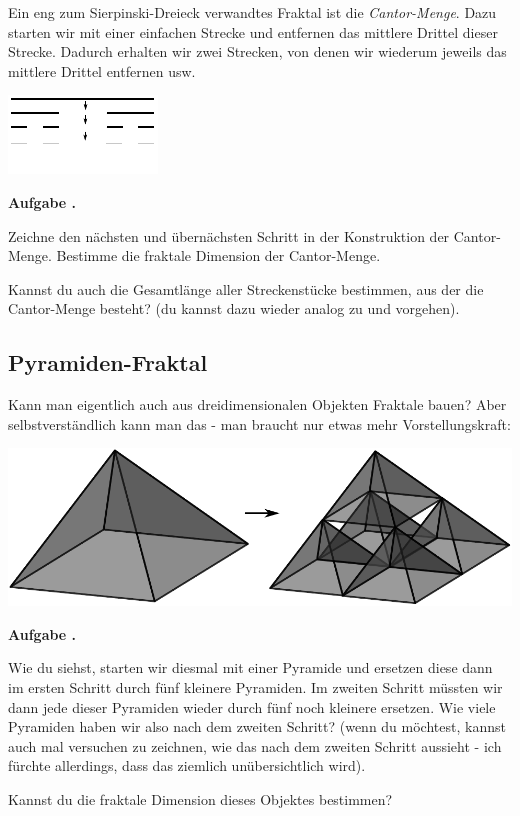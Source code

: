 \documentclass[a4paper,ngerman,12pt]{scrartcl}
\theoremstyle{definition}
\theoremstyle{plain}
\theoremstyle{remark}
\newlength{\aufgabenskip}
\newcounter{aufgabennummer}
\newenvironment{aufgabe}[1]{
  \addtocounter{aufgabennummer}{1}
  \textbf{Aufgabe \theaufgabennummer.} \emph{#1} \par
}{\vspace{\aufgabenskip}}
\begin{document}
Ein eng zum Sierpinski-Dreieck verwandtes Fraktal ist die \emph{Cantor-Menge}. Dazu starten wir mit einer einfachen Strecke und entfernen das mittlere Drittel dieser Strecke. Dadurch erhalten wir zwei Strecken, von denen wir wiederum jeweils das mittlere Drittel entfernen usw.

\begin{center}
	\includegraphics[width=.5\textwidth]{Bilder/Cantor_Menge.pdf}
\end{center}

\begin{aufgabe}{}
	Zeichne den nächsten und übernächsten Schritt in der Konstruktion der Cantor-Menge. Bestimme die fraktale Dimension der Cantor-Menge. 
	
	Kannst du auch die Gesamtlänge aller \glqq Streckenstücke\grqq{} bestimmen, aus der die Cantor-Menge besteht? (du kannst dazu wieder analog zu  und  vorgehen).
\end{aufgabe}


\subsection{Pyramiden-Fraktal}

Kann man eigentlich auch aus dreidimensionalen Objekten Fraktale bauen? Aber selbstverständlich kann man das - man braucht nur etwas mehr Vorstellungskraft:

\begin{center}
	\includegraphics[width=.6\textwidth]{Bilder/Pyramiden.pdf}
\end{center}

\begin{aufgabe}{}
	Wie du siehst, starten wir diesmal mit einer Pyramide und ersetzen diese dann im ersten Schritt durch fünf kleinere Pyramiden. Im zweiten Schritt müssten wir dann jede dieser Pyramiden wieder durch fünf noch kleinere ersetzen. Wie viele Pyramiden haben wir also nach dem zweiten Schritt? (wenn du möchtest, kannst auch mal versuchen zu zeichnen, wie das nach dem zweiten Schritt aussieht - ich fürchte allerdings, dass das ziemlich unübersichtlich wird).
	
	Kannst du die fraktale Dimension dieses Objektes bestimmen? 
\end{aufgabe}
	
\end{document}
